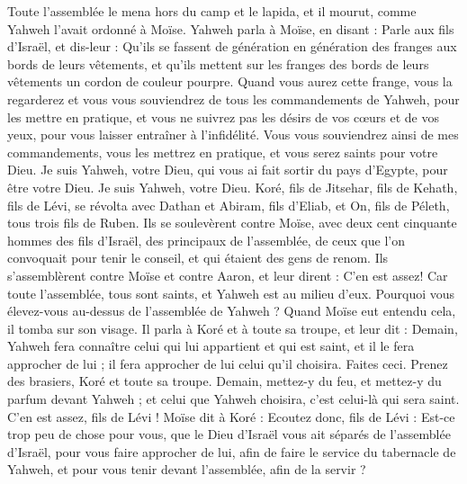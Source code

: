 \begin{multicols}{2}
Toute l'assemblée le mena hors du camp et le lapida, et il mourut, comme Yahweh l'avait ordonné à Moïse.
Yahweh parla à Moïse, en disant :
Parle aux fils d'Israël, et dis-leur : Qu'ils se fassent de génération en génération des franges aux bords de leurs vêtements, et qu'ils mettent sur les franges des bords de leurs vêtements un cordon de couleur pourpre.
Quand vous aurez cette frange, vous la regarderez et vous vous souviendrez de tous les commandements de Yahweh, pour les mettre en pratique, et vous ne suivrez pas les désirs de vos cœurs et de vos yeux, pour vous laisser entraîner à l’infidélité.
Vous vous souviendrez ainsi de mes commandements, vous les mettrez en pratique, et vous serez saints pour votre Dieu.
Je suis Yahweh, votre Dieu, qui vous ai fait sortir du pays d'Egypte, pour être votre Dieu. Je suis Yahweh, votre Dieu.
\VerseOne{}Koré, fils de Jitsehar, fils de Kehath, fils de Lévi, se révolta avec Dathan et Abiram, fils d'Eliab, et On, fils de Péleth, tous trois fils de Ruben.
Ils se soulevèrent contre Moïse, avec deux cent cinquante hommes des fils d'Israël, des principaux de l'assemblée, de ceux que l’on convoquait pour tenir le conseil, et qui étaient des gens de renom.
Ils s'assemblèrent contre Moïse et contre Aaron, et leur dirent : C’en est assez! Car toute l'assemblée, tous sont saints, et Yahweh est au milieu d'eux. Pourquoi vous élevez-vous au-dessus de l'assemblée de Yahweh ?
Quand Moïse eut entendu cela, il tomba sur son visage.
Il parla à Koré et à toute sa troupe, et leur dit : Demain, Yahweh fera connaître celui qui lui appartient et qui est saint, et il le fera approcher de lui ; il fera approcher de lui celui qu'il choisira.
Faites ceci. Prenez des brasiers, Koré et toute sa troupe.
Demain, mettez-y du feu, et mettez-y du parfum devant Yahweh ; et celui que Yahweh choisira, c’est celui-là qui sera saint. C’en est assez, fils de Lévi !
Moïse dit à Koré : Ecoutez donc, fils de Lévi :
Est-ce trop peu de chose pour vous, que le Dieu d’Israël vous ait séparés de l’assemblée d’Israël, pour vous faire approcher de lui, afin de faire le service du tabernacle de Yahweh, et pour vous tenir devant l’assemblée, afin de la servir ?

\end{multicols}
